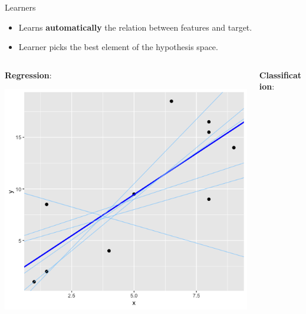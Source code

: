 \documentclass[11pt,compress,t,notes=noshow, xcolor=table]{beamer}
\begin{document}
\begin{vbframe}{Learners}

\begin{itemize}

\item Learns \textbf{automatically} the relation between features and target.
\item Learner picks the best element of the hypothesis space.
\end{itemize} \hspace{0.4cm}

\begin{columns}    
\begin{column}{0.4\textwidth} 
\textbf{Regression}: 

  \begin{center}
    \includegraphics[width=\textwidth]{figure_man/Model_Regression_Plot.png} 
  \end{center}
\end{column}    

\begin{column}{0.4\textwidth} 
\textbf{Classification}:
  

\end{column}
\end{columns}
\end{vbframe}
\end{document}
